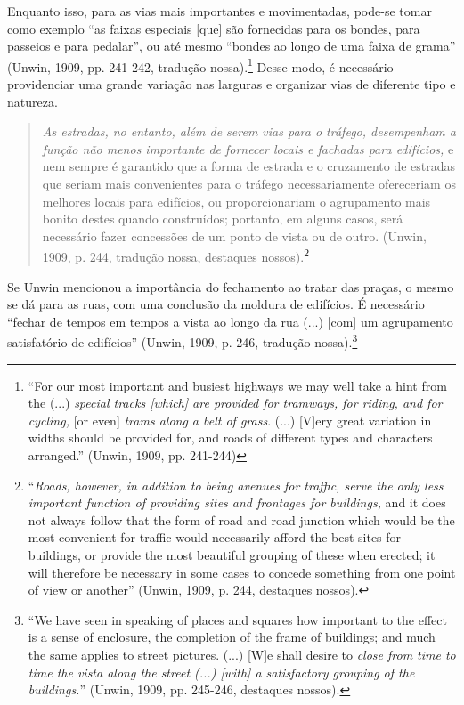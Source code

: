 \documentclass[12pt, a4paper]{book} %
\begin{document}
        Enquanto isso, para as vias mais importantes e movimentadas, pode-se tomar como exemplo ``as faixas especiais [que] são fornecidas para os bondes, para passeios e para pedalar'', ou até mesmo ``bondes ao longo de uma faixa de grama'' (Unwin, 1909, pp. 241-242, tradução nossa).\footnote[85]{``For our most important and busiest highways we may well take a hint from the (...) \textit{special tracks [which] are provided for tramways, for riding, and for cycling,} [or even] \textit{trams along a belt of grass}. (...) [V]ery great variation in widths should be provided for, and roads of different types and characters arranged.'' (Unwin, 1909, pp. 241-244)} Desse modo, é necessário providenciar uma grande variação nas larguras e organizar vias de diferente tipo e natureza.

        \begin{quotation}
            \textit{As estradas, no entanto, além de serem vias para o tráfego, desempenham a função não menos importante de fornecer locais e fachadas para edifícios,} e nem sempre é garantido que a forma de estrada e o cruzamento de estradas que seriam mais convenientes para o tráfego necessariamente ofereceriam os melhores locais para edifícios, ou proporcionariam o agrupamento mais bonito destes quando construídos; portanto, em alguns casos, será necessário fazer concessões de um ponto de vista ou de outro. (Unwin, 1909, p. 244, tradução nossa, destaques nossos).\footnote[86]{``\textit{Roads, however, in addition to being avenues for traffic, serve the only less important function of providing sites and frontages for buildings,} and it does not always follow that the form of road and road junction which would be the most convenient for traffic would necessarily afford the best sites for buildings, or provide the most beautiful grouping of these when erected; it will therefore be necessary in some cases to concede something from one point of view or another'' (Unwin, 1909, p. 244, destaques nossos).}
        \end{quotation}
        
        Se Unwin mencionou a importância do fechamento ao tratar das praças, o mesmo se dá para as ruas, com uma conclusão da moldura de edifícios. É necessário ``fechar de tempos em tempos a vista ao longo da rua (...) [com] um agrupamento satisfatório de edifícios'' (Unwin, 1909, p. 246, tradução nossa).\footnote[87]{``We have seen in speaking of places and squares how important to the effect is a sense of enclosure, the completion of the frame of buildings; and much the same applies to street pictures. (...) [W]e shall desire to \textit{close from time to time the vista along the street (...) [with] a satisfactory grouping of the buildings.}'' (Unwin, 1909, pp. 245-246, destaques nossos).}
\end{document}

